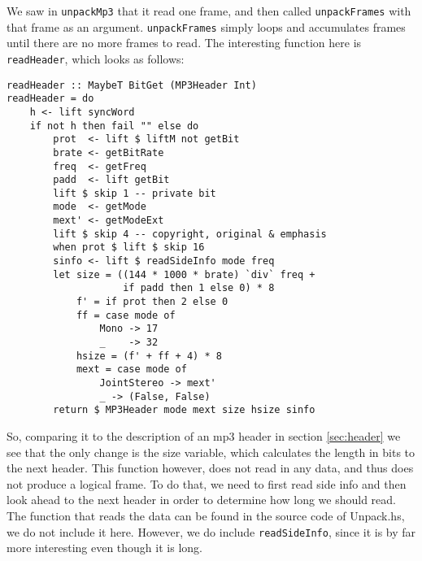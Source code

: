 \documentclass[a4paper,12pt]{article}
\begin{document}
    We saw in \texttt{unpackMp3} that it read one frame, and then called
    \texttt{unpackFrames} with that frame as an argument. \texttt{unpackFrames}
    simply loops and accumulates frames until there are no more frames to read.
    The interesting function here is \texttt{readHeader}, which looks as
    follows:
    \begin{lstlisting}
readHeader :: MaybeT BitGet (MP3Header Int)
readHeader = do
    h <- lift syncWord
    if not h then fail "" else do
        prot  <- lift $ liftM not getBit
        brate <- getBitRate
        freq  <- getFreq
        padd  <- lift getBit
        lift $ skip 1 -- private bit
        mode  <- getMode
        mext' <- getModeExt
        lift $ skip 4 -- copyright, original & emphasis
        when prot $ lift $ skip 16
        sinfo <- lift $ readSideInfo mode freq
        let size = ((144 * 1000 * brate) `div` freq +
                    if padd then 1 else 0) * 8
            f' = if prot then 2 else 0
            ff = case mode of
                Mono -> 17
                _    -> 32
            hsize = (f' + ff + 4) * 8
            mext = case mode of
                JointStereo -> mext'
                _ -> (False, False)
        return $ MP3Header mode mext size hsize sinfo
    \end{lstlisting}
    So, comparing it to the description of an mp3 header in section
    \ref{sec:header} we see that the only change is the size variable, which
    calculates the length in bits to the next header. This function however,
    does not read in any data, and thus does not produce a logical frame. To do
    that, we need to first read side info and then look ahead to the next
    header in order to determine how long we should read. The function that
    reads the data can be found in the source code of Unpack.hs, we do not
    include it here. However, we do include \texttt{readSideInfo}, since it is
    by far more interesting even though it is long.
\end{document}
